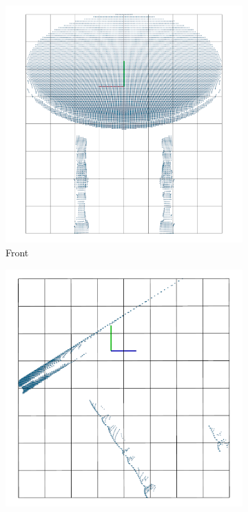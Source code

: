 \begin{figure}[!htb]
	\centering
	\hfill
	\begin{subfigure}{0.325\textwidth}
		\centering
		\includegraphics[width=\linewidth]{Figures/ObjRecog/adaptive_front}
		\caption{Front}
		\label{subfig:objrecog:adaptive:front}
	\end{subfigure}
	\hfill
	\begin{subfigure}{0.325\textwidth}
		\centering
		\includegraphics[width=\linewidth]{Figures/ObjRecog/adaptive_side}

\end{subfigure}
\end{figure}
